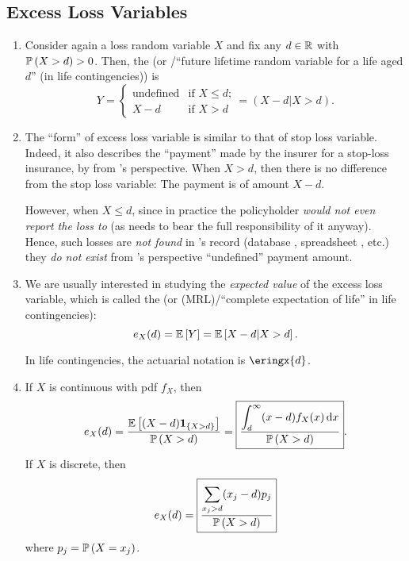 \subsection{Excess Loss Variables}
\begin{enumerate}
\item Consider again a loss random variable \(X\) and fix any \(d\in\mathbb{R}\) with
\(\mathbb{P}\left(X>d\right)>0\). Then, the  (or /``future lifetime random variable for a life aged \(d\)'' (in life
contingencies)) is 
\[
Y=\begin{cases}
\text{undefined}&\text{if \(X\le d\);}\\
X-d&\text{if \(X>d\)}
\end{cases}
=(X-d|X>d).
\]

\item The ``form'' of excess loss variable is similar to that of stop loss
variable. Indeed, it also describes the ``payment'' made by the insurer
 for a stop-loss insurance, by from 's
perspective. When \(X>d\), then there is no difference from the stop loss
variable: The payment is of amount \(X-d\).

However, when \(X\le d\), since in practice the policyholder 
\emph{would not even report the loss to } (as 
needs to bear the full responsibility of it anyway). Hence, such losses are
\emph{not found} in 's record (database ,
spreadsheet , etc.)  they \emph{do not
exist} from 's perspective  ``undefined''
payment amount.

\item We are usually interested in studying the \emph{expected value} of the
excess loss variable, which is called the  (or
 (MRL)/``complete expectation of life'' in life
contingencies):
\[
e_{X}(d)=\mathbb{E}\left[Y\right]=\mathbb{E}\left[X-d|X>d\right].
\]
\begin{note}
In life contingencies, the actuarial notation is \(\eringx{d}\).
\end{note}
\item \label{it:mrl-fmlas}
If \(X\) is continuous with pdf \(f_X\), then
\[
e_X(d)=\frac{\mathbb{E}\left[(X-d)\mathbf{1}_{\left\{X>d\right\}}\right]}{\mathbb{P}\left(X>d\right)}
=\boxed{\frac{\displaystyle\int_{d}^{\infty}(x-d)f_X(x)\dd{x}}{\mathbb{P}\left(X>d\right)}}.
\]
If \(X\) is discrete, then
\[
e_X(d)=\boxed{\frac{\displaystyle \sum_{x_j>d}^{}(x_j-d)p_j}{\mathbb{P}\left(X>d\right)}}
\]
where \(p_j=\mathbb{P}\left(X=x_j\right)\).


\end{enumerate}
